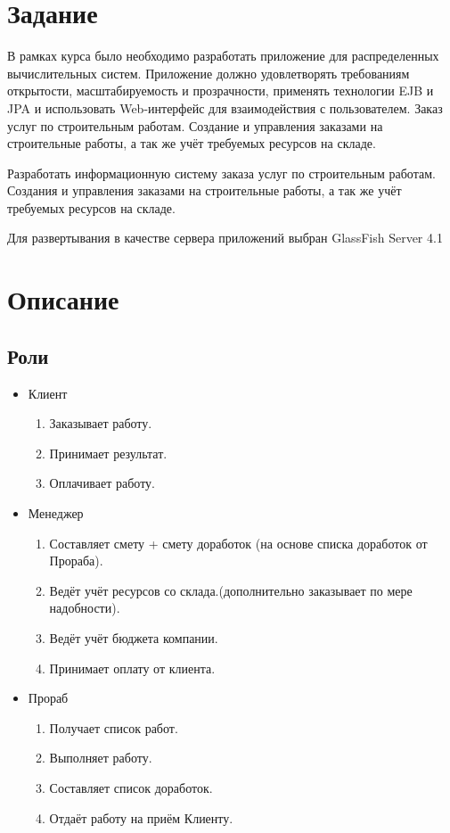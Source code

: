 \section{Задание}
В рамках курса было необходимо разработать приложение для распределенных вычислительных систем. Приложение должно удовлетворять требованиям открытости, масштабируемость и прозрачности, применять технологии EJB и JPA и использовать Web-интерфейс для взаимодействия с пользователем.
Заказ услуг по строительным работам. Создание и управления заказами на строительные работы, а так же учёт требуемых ресурсов на складе.

Разработать информационную систему заказа услуг по строительным работам. Создания и управления заказами на строительные работы, а так же учёт требуемых ресурсов на складе.

Для развертывания в качестве сервера приложений выбран GlassFish Server 4.1
\section{Описание}
\subsection{Роли}
\begin{itemize}
\item Клиент
	\begin{enumerate}
	\item Заказывает работу.
	\item Принимает результат.
	\item Оплачивает работу.
	\end{enumerate}
\item Менеджер
	\begin{enumerate}
	\item Составляет смету + смету доработок (на основе списка доработок от Прораба).
	\item Ведёт учёт ресурсов со склада.(дополнительно заказывает по мере надобности).
	\item Ведёт учёт бюджета компании.
	\item Принимает оплату от клиента.
	\end{enumerate}
\item Прораб
	\begin{enumerate}
	\item Получает список работ.
	\item Выполняет работу.
	\item Составляет список доработок.
	\item Отдаёт работу на приём Клиенту.
	\end{enumerate}
\end{itemize}
\newpage
